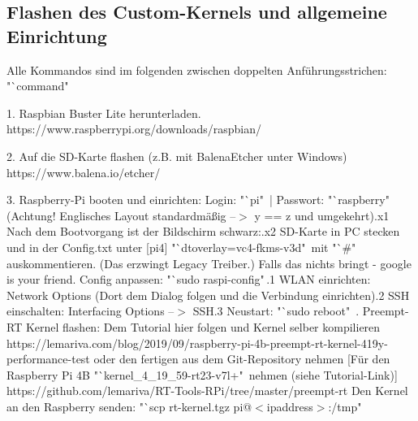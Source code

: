 \documentclass[12pt,a4paper,bibliography=totoc,listof=totoc]{scrartcl}
\begin{document}
\subsection{Flashen des Custom-Kernels und allgemeine Einrichtung}
Alle Kommandos sind im folgenden zwischen doppelten Anführungsstrichen: "`command"\,

1. Raspbian Buster Lite herunterladen.
   https://www.raspberrypi.org/downloads/raspbian/
\newline

2. Auf die SD-Karte flashen (z.B. mit BalenaEtcher unter Windows)\newline
   https://www.balena.io/etcher/
\newline

3. Raspberry-Pi booten und einrichten:
 Login: "`pi"\, | Passwort: "`raspberry"\, (Achtung! Englisches Layout standardmäßig --$>$ y == z und umgekehrt).x1 Nach dem Bootvorgang ist der Bildschirm schwarz:.x2 SD-Karte in PC stecken und in der Config.txt unter [pi4] "`dtoverlay=vc4-fkms-v3d"\, mit "`\#"\, auskommentieren.
       (Das erzwingt Legacy Treiber.) Falls das nichts bringt - google is your friend.
 Config anpassen: "`sudo raspi-config"\,.1 WLAN einrichten: Network Options (Dort dem Dialog folgen und die Verbindung einrichten).2 SSH einschalten: Interfacing Options --$>$ SSH.3 Neustart: "`sudo reboot"\,\newline
{}. Preempt-RT Kernel flashen: Dem Tutorial hier folgen und Kernel selber kompilieren\newline
    https://lemariva.com/blog/2019/09/raspberry-pi-4b-preempt-rt-kernel-419y-performance-test
    oder den fertigen aus dem Git-Repository nehmen [Für den Raspberry Pi 4B "`kernel\_4\_19\_59-rt23-v7l+"\, nehmen (siehe Tutorial-Link)]
    https://github.com/lemariva/RT-Tools-RPi/tree/master/preempt-rt Den Kernel an den Raspberry senden: "`scp rt-kernel.tgz pi@$<$ipaddress$>$:/tmp"\,\newline
\end{document}
